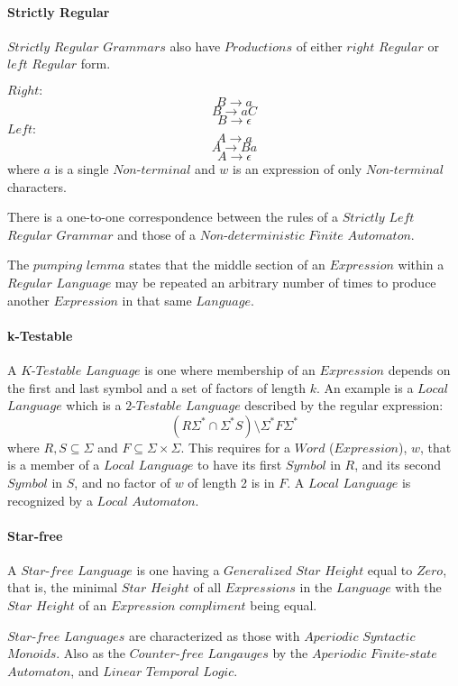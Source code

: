 \documentclass{article}
\begin{document}
\paragraph{Strictly Regular}
$Strictly$ $Regular$ $Grammars$ also have $Productions$ of either
$right$ $Regular$ or $left$ $Regular$ form.

$Right:$
\[
    B \rightarrow a
\]\[
    B \rightarrow aC
\]\[
    B \rightarrow \epsilon
\]
$Left:$
\[
    A \rightarrow a
\]\[
    A \rightarrow Ba
\]\[
    A \rightarrow \epsilon
\]
where $a$ is a single $Non$-$terminal$ and $w$ is an expression of
only $Non$-$terminal$ characters.

There is a one-to-one correspondence between the rules of a $Strictly$
$Left$ $Regular$ $Grammar$ and those of a $Non$-$deterministic$
$Finite$ $Automaton$.

The $pumping$ $lemma$ states that the middle section of an
$Expression$ within a $Regular$ $Language$ may be repeated an
arbitrary number of times to produce another $Expression$ in that same
$Language$.

\paragraph{k-Testable}
A $K$-$Testable$ $Language$ is one where membership of an $Expression$
depends on the first and last symbol and a set of factors of length
$k$. An example is a $Local$ $Language$ which is a $2$-$Testable$
$Language$ described by the regular expression:
\[
    (R\Sigma^* \cap \Sigma^*S)\setminus\Sigma^*F\Sigma^*
\]
where $R,S \subseteq \Sigma$ and $F \subseteq \Sigma \times
\Sigma$. This requires for a $Word$ ($Expression$), $w$, that is a
member of a $Local$ $Language$ to have its first $Symbol$ in $R$, and
its second $Symbol$ in $S$, and no factor of $w$ of length 2 is in
$F$. A $Local$ $Language$ is recognized by a $Local$ $Automaton$.

\paragraph{Star-free}
A $Star$-$free$ $Language$ is one having a $Generalized$ $Star$
$Height$ equal to $Zero$, that is, the minimal $Star$ $Height$ of all
$Expressions$ in the $Language$ with the $Star$ $Height$ of an
$Expression$ $compliment$ being equal.

$Star$-$free$ $Languages$ are characterized as those with $Aperiodic$
$Syntactic$ $Monoids$. Also as the $Counter$-$free$ $Langauges$ by the
$Aperiodic$ $Finite$-$state$ $Automaton$, and $Linear$ $Temporal$
$Logic$.
\end{document}

